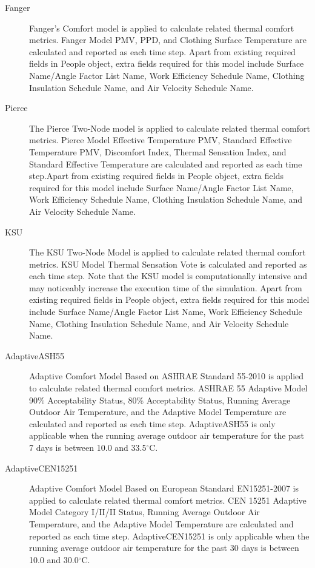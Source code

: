 \begin{description}
  \item[Fanger]
  Fanger’s Comfort model is applied to calculate related thermal comfort metrics. Fanger Model PMV, PPD, and Clothing Surface Temperature are calculated and reported as each time step. Apart from existing required fields in People object, extra fields required for this model include Surface Name/Angle Factor List Name, Work Efficiency Schedule Name, Clothing Insulation Schedule Name, and Air Velocity Schedule Name.

  \item[Pierce]
  The Pierce Two-Node model is applied to calculate related thermal comfort metrics. Pierce Model Effective Temperature PMV, Standard Effective Temperature PMV, Discomfort Index, Thermal Sensation Index, and Standard Effective Temperature are calculated and reported as each time step.Apart from existing required fields in People object, extra fields required for this model include Surface Name/Angle Factor List Name, Work Efficiency Schedule Name, Clothing Insulation Schedule Name, and Air Velocity Schedule Name.

  \item[KSU]
  The KSU Two-Node Model is applied to calculate related thermal comfort metrics. KSU Model Thermal Sensation Vote is calculated and reported as each time step. Note that the KSU model is computationally intensive and may noticeably increase the execution time of the simulation. Apart from existing required fields in People object, extra fields required for this model include Surface Name/Angle Factor List Name, Work Efficiency Schedule Name, Clothing Insulation Schedule Name, and Air Velocity Schedule Name.

  \item[AdaptiveASH55]
  Adaptive Comfort Model Based on ASHRAE Standard 55-2010 is applied to calculate related thermal comfort metrics. ASHRAE 55 Adaptive Model 90\% Acceptability Status, 80\% Acceptability Status, Running Average Outdoor Air Temperature, and the Adaptive Model Temperature are calculated and reported as each time step. AdaptiveASH55 is only applicable when the running average outdoor air temperature for the past 7 days is between 10.0 and 33.5$^\circ$C.

  \item[AdaptiveCEN15251]
  Adaptive Comfort Model Based on European Standard EN15251-2007 is applied to calculate related thermal comfort metrics. CEN 15251 Adaptive Model Category I/II/II Status, Running Average Outdoor Air Temperature, and the Adaptive Model Temperature are calculated and reported as each time step. AdaptiveCEN15251 is only applicable when the running average outdoor air temperature for the past 30 days is between 10.0 and 30.0$^\circ$C.


\end{description}
